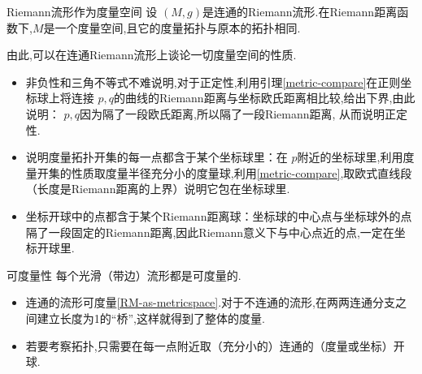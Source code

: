 \documentclass[../../几何与拓扑.tex]{subfiles}
\begin{document}
\begin{theorem}{Riemann流形作为度量空间}\label{RM-as-metricspace}
    设 $ \left( M,g \right)  $是连通的Riemann流形.在Riemann距离函数下,$ M $是一个度量空间,且它的度量拓扑与原本的拓扑相同.  
\end{theorem}

\begin{remark}
    由此,可以在连通Riemann流形上谈论一切度量空间的性质.
\end{remark}
\begin{note}
    \begin{itemize}
        \item 非负性和三角不等式不难说明,对于正定性,利用引理\ref{metric-compare}在正则坐标球上将连接 $ p,q $的曲线的Riemann距离与坐标欧氏距离相比较,给出下界,由此说明： $ p,q $因为隔了一段欧氏距离,所以隔了一段Riemann距离, 从而说明正定性.
        \item 说明度量拓扑开集的每一点都含于某个坐标球里：在 $ p $附近的坐标球里,利用度量开集的性质取度量半径充分小的度量球,利用\ref{metric-compare},取欧式直线段（长度是Riemann距离的上界）说明它包在坐标球里.
        \item 坐标开球中的点都含于某个Riemann距离球：坐标球的中心点与坐标球外的点隔了一段固定的Riemann距离,因此Riemann意义下与中心点近的点,一定在坐标开球里.
    \end{itemize}
    
\end{note}

\begin{corollary}{可度量性}
    每个光滑（带边）流形都是可度量的.
\end{corollary}
\begin{note}
    \begin{itemize}
        \item 连通的流形可度量\ref{RM-as-metricspace}.对于不连通的流形,在两两连通分支之间建立长度为1的“桥”,这样就得到了整体的度量.
        \item 若要考察拓扑,只需要在每一点附近取（充分小的）连通的（度量或坐标）开球.
    \end{itemize}
 
\end{note}
\end{document}

